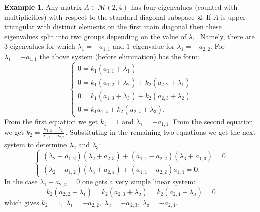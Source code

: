 \documentclass[10pt,twoside,a4paper,reqno]{amsart}
\theoremstyle{plain}
\theoremstyle{definition}
\newtheorem{exam+}           {Example}
\theoremstyle{remark}
\newenvironment{example}{\begin{exam+}}{\end{exam+}}
\begin{document}
\begin{example} Any matrix $A\in {\mathcal {M}}(2,4)$ has  four  eigenvalues (counted with multiplicities) with respect to  the standard diagonal subspace ${\mathfrak L}$. If $A$ is upper-triangular with distinct elements on the first main diagonal then these eigenvalues split into two groups  depending on the value of ${\lambda}_1$. Namely, there are $3$ eigenvalues for which ${\lambda}_1=-a_{1,1}$ and $1$ eigenvalue for ${\lambda}_1=-a_{2,2}$. For ${\lambda}_1=-a_{1,1}$ the above system (before elimination) has the form:
$$\begin{cases} 0=k_1(a_{1,1}+{\lambda}_1)\\
                              0=k_1(a_{1,2}+{\lambda}_2)+k_2(a_{2,2}+{\lambda}_1)\\
                              0=k_1(a_{1,3}+{\lambda}_3)+k_2(a_{2,3}+{\lambda}_2)\\
                              0=k_1a_{1,4}+k_2(a_{2,4}+{\lambda}_3).
\end{cases}$$
From the first equation we get $k_1=1$ and ${\lambda}_1=-a_{1,1}$. From the second equation we get
$k_2=\frac{a_{1,2}+{\lambda}_2}{a_{1,1}-a_{2,2}}$. Substituting in the remaining two equations we get the next system to determine ${\lambda}_2$ and ${\lambda}_3$:
$$\begin{cases}
({\lambda}_2+a_{1,2})({\lambda}_2+a_{2,3})+(a_{1,1}-a_{2,2})({\lambda}_3+a_{1,3})=0\\
({\lambda}_2+a_{1,2})({\lambda}_3+a_{2,4})+(a_{1,1}-a_{2,2})a_{1,4}=0.
\end{cases}
$$
In the case  ${\lambda}_1+a_{2,2}=0$ one gets a very simple linear system:
$$k_2(a_{2,2}+{\lambda}_1)=k_2(a_{2,3}+{\lambda}_2)=k_2(a_{2,4}+{\lambda}_3)=0$$
which gives $k_2=1,\;{\lambda}_1=-a_{2,2},\;{\lambda}_2=-a_{2,3},\;{\lambda}_3=-a_{2,4}.$
\end{example}
\end{document}
